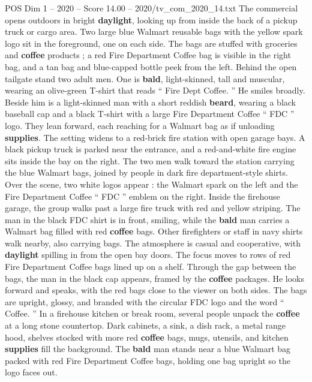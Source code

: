 \begin{textsample}{POS Dim 1 – 2020 – Score 14.00 – 2020/tv\_com\_2020\_14.txt}  \label{ex:f1_pos_017}
The commercial opens outdoors in bright \textbf{daylight}, looking up from inside the back of a pickup truck or cargo area.
Two large blue Walmart reusable bags with the yellow spark logo sit in the foreground, one on each side.
The bags are stuffed with groceries and \textbf{coffee} products ; a red Fire Department Coffee bag is visible in the right bag, and a tan bag and blue-capped bottle peek from the left.
Behind the open tailgate stand two adult men.
One is \textbf{bald}, light-skinned, tall and muscular, wearing an olive-green T-shirt that reads “ Fire Dept Coffee. ” He smiles broadly.
Beside him is a light-skinned man with a short reddish \textbf{beard}, wearing a black baseball cap and a black T-shirt with a large Fire Department Coffee “ FDC ” logo.
They lean forward, each reaching for a Walmart bag as if unloading \textbf{supplies}.
The setting widens to a red-brick fire station with open garage bays.
A black pickup truck is parked near the entrance, and a red-and-white fire engine sits inside the bay on the right.
The two men walk toward the station carrying the blue Walmart bags, joined by people in dark fire department-style shirts.
Over the scene, two white logos appear : the Walmart spark on the left and the Fire Department Coffee “ FDC ” emblem on the right.
Inside the firehouse garage, the group walks past a large fire truck with red and yellow striping.
The man in the black FDC shirt is in front, smiling, while the \textbf{bald} man carries a Walmart bag filled with red \textbf{coffee} bags.
Other firefighters or staff in navy shirts walk nearby, also carrying bags.
The atmosphere is casual and cooperative, with \textbf{daylight} spilling in from the open bay doors.
The focus moves to rows of red Fire Department Coffee bags lined up on a shelf.
Through the gap between the bags, the man in the black cap appears, framed by the \textbf{coffee} packages.
He looks forward and speaks, with the red bags close to the viewer on both sides.
The bags are upright, glossy, and branded with the circular FDC logo and the word “ Coffee. ” In a firehouse kitchen or break room, several people unpack the \textbf{coffee} at a long stone countertop.
Dark cabinets, a sink, a dish rack, a metal range hood, shelves stocked with more red \textbf{coffee} bags, mugs, utensils, and kitchen \textbf{supplies} fill the background.
The \textbf{bald} man stands near a blue Walmart bag packed with red Fire Department Coffee bags, holding one bag upright so the logo faces out.

\end{textsample}
